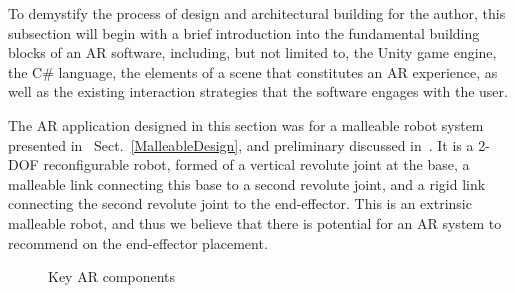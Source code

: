 To demystify the process of design and architectural building for the author, this subsection will begin with a brief introduction into the fundamental building blocks of an AR software, including, but not limited to, the Unity game engine, the C\# language, the elements of a scene that constitutes an AR experience, as well as the existing interaction strategies that the software engages with the user.

The AR application designed in this section was for a malleable robot system presented in~ Sect.~\ref{MalleableDesign}, and preliminary discussed in~\cite{clark2020design}. It is a 2-DOF reconfigurable robot, formed of a vertical revolute joint at the base, a malleable link connecting this base to a second revolute joint, and a rigid link connecting the second revolute joint to the end-effector. This is an extrinsic malleable robot, and thus we believe that there is potential for an AR system to recommend on the end-effector placement.

\begin{figure}[t!]
    \centering
    \caption{Key AR components}
    \label{fig:Key_AR components}
\end{figure}

